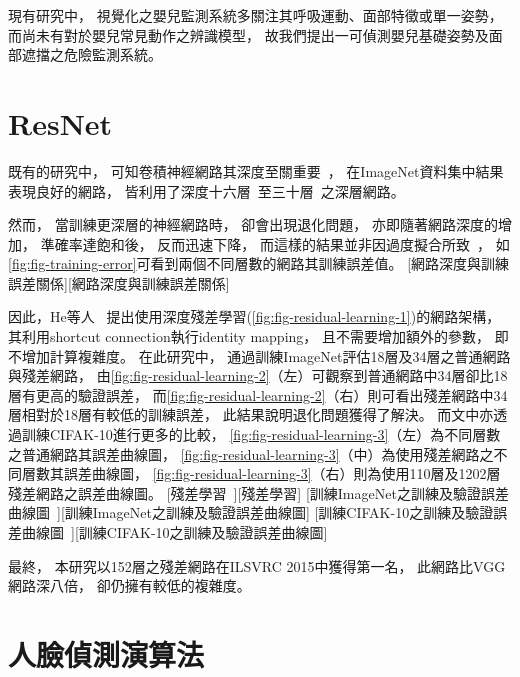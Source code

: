 \documentclass[class=NCU_thesis, crop=false]{standalone}
\begin{document}
現有研究中，
視覺化之嬰兒監測系統多關注其呼吸運動、面部特徵或單一姿勢，
而尚未有對於嬰兒常見動作之辨識模型，
故我們提出一可偵測嬰兒基礎姿勢及面部遮擋之危險監測系統。

\section{ResNet}
既有的研究中，
可知卷積神經網路其深度至關重要~\cite{simonyan_very_2015, szegedy_going_2015}，
在ImageNet資料集中結果表現良好的網路，
皆利用了深度十六層~\cite{simonyan_very_2015}至三十層~\cite{ioffe_batch_2015}之深層網路。

然而，
當訓練更深層的神經網路時，
卻會出現退化問題，
亦即隨著網路深度的增加，
準確率達飽和後，
反而迅速下降，
而這樣的結果並非因過度擬合所致~\cite{he_convolutional_2015, srivastava_highway_2015}，
如\cref{fig:fig-training-error}可看到兩個不同層數的網路其訓練誤差值。
[網路深度與訓練誤差關係][網路深度與訓練誤差關係]

因此，He等人~\cite{he_deep_2016}
提出使用深度殘差學習(\cref{fig:fig-residual-learning-1})的網路架構，
其利用shortcut connection執行identity mapping，
且不需要增加額外的參數，
即不增加計算複雜度。
在此研究中，
通過訓練ImageNet評估18層及34層之普通網路與殘差網路，
由\cref{fig:fig-residual-learning-2}（左）可觀察到普通網路中34層卻比18層有更高的驗證誤差，
而\cref{fig:fig-residual-learning-2}（右）則可看出殘差網路中34層相對於18層有較低的訓練誤差，
此結果說明退化問題獲得了解決。
而文中亦透過訓練CIFAK-10進行更多的比較，
\cref{fig:fig-residual-learning-3}（左）為不同層數之普通網路其誤差曲線圖，
\cref{fig:fig-residual-learning-3}（中）為使用殘差網路之不同層數其誤差曲線圖，
\cref{fig:fig-residual-learning-3}（右）則為使用110層及1202層殘差網路之誤差曲線圖。
[殘差學習~\cite{he_deep_2016}][殘差學習]
[訓練ImageNet之訓練及驗證誤差曲線圖~\cite{he_deep_2016}][訓練ImageNet之訓練及驗證誤差曲線圖]
[訓練CIFAK-10之訓練及驗證誤差曲線圖~\cite{he_deep_2016}][訓練CIFAK-10之訓練及驗證誤差曲線圖]

最終，
本研究以152層之殘差網路在ILSVRC 2015中獲得第一名，
此網路比VGG網路深八倍，
卻仍擁有較低的複雜度。

\section{人臉偵測演算法}
\end{document}
